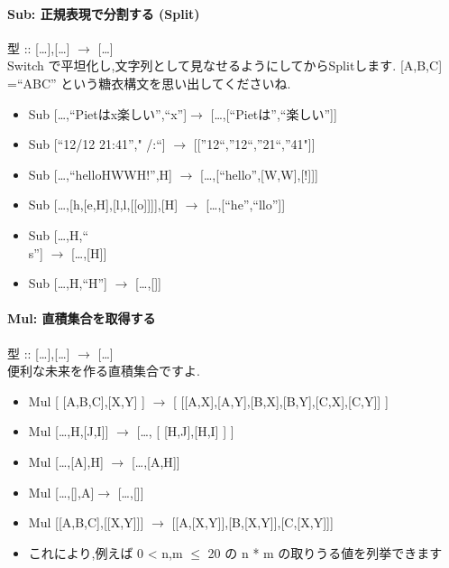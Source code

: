 \paragraph{Sub: 正規表現で分割する (Split)}

型 :: {[}\ldots{}{]},{[}\ldots{}{]} $\to$
{[}\ldots{}{]}\\Switch
で平坦化し,文字列として見なせるようにしてからSplitします. {[}A,B,C{]}
=``ABC'' という糖衣構文を思い出してくださいね.

\begin{itemize}
\item
  Sub {[}\ldots{},``Pietはx楽しい'',``x''{]}$\to$
  {[}\ldots{},{[}``Pietは'',``楽しい''{]}{]}
\item
  Sub {[}``12/12 21:41''," \textbar{}/\textbar{}:``{]} $\to$
  {[}{[}''12``,''12``,''21``,''41"{]}{]}
\item
  Sub {[}\ldots{},``helloHWWH!'',H{]} $\to$
  {[}\ldots{},{[}``hello'',{[}W,W{]},{[}!{]}{]}{]}
\item
  Sub {[}\ldots{},{[}h,{[}e,H{]},{[}l,l,{[}{[}o{]}{]}{]}{]},{[}H{]}
  $\to$ {[}\ldots{},{[}``he'',``llo''{]}{]}
\item
  Sub {[}\ldots{},H,``\\s''{]} $\to$ {[}\ldots{},{[}H{]}{]}
\item
  Sub {[}\ldots{},H,``H''{]} $\to$ {[}\ldots{},{[}{]}{]}
\end{itemize}

\paragraph{Mul: 直積集合を取得する}

型 :: {[}\ldots{}{]},{[}\ldots{}{]} $\to$
{[}\ldots{}{]}\\便利な未来を作る直積集合ですよ.

\begin{itemize}
\item
  Mul {[} {[}A,B,C{]},{[}X,Y{]} {]} $\to$ {[}
  {[}{[}A,X{]},{[}A,Y{]},{[}B,X{]},{[}B,Y{]},{[}C,X{]},{[}C,Y{]}{]} {]}
\item
  Mul {[}\ldots{},H,{[}J,I{]}{]} $\to$ {[}\ldots{}, {[}
  {[}H,J{]},{[}H,I{]} {]} {]}
\item
  Mul {[}\ldots{},{[}A{]},H{]} $\to$ {[}\ldots{},{[}A,H{]}{]}
\item
  Mul {[}\ldots{},{[}{]},A{]}$\to$ {[}\ldots{},{[}{]}{]}
\item
  Mul {[}{[}A,B,C{]},{[}{[}X,Y{]}{]}{]} $\to$
  {[}{[}A,{[}X,Y{]}{]},{[}B,{[}X,Y{]}{]},{[}C,{[}X,Y{]}{]}{]}
\item
  これにより,例えば 0 \textless{} n,m $\leq$ 20 の n * m
  の取りうる値を列挙できます
\end{itemize}

